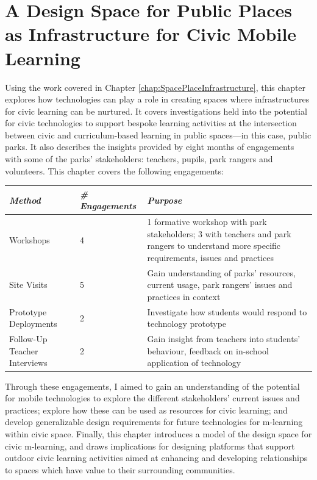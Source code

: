\chapter{A Design Space for Public Places as Infrastructure for Civic Mobile Learning}
\label{chap:DesignSpace}

Using the work covered in Chapter \ref{chap:SpacePlaceInfrastructure}, this chapter explores how technologies can play a role in creating spaces where infrastructures for civic learning can be nurtured. It covers investigations held into the potential for civic technologies to support bespoke learning activities at the intersection between civic and curriculum-based learning in public spaces---in this case, public parks. It also describes the insights provided by eight months of engagements with some of the parks' stakeholders: teachers, pupils, park rangers and volunteers. This chapter covers the following engagements:

{\centering
\begin{tabularx}{\textwidth}{| p{30mm} |  p{25mm} | X |}
\hline
    {\small\textit{\textbf{Method}}}
    & {\small\textit{\textbf{\# Engagements}}} 
    & {\small\textit{\textbf{Purpose}}} \\
    \hline
    {\footnotesize Workshops }
    & {\footnotesize 4} 
    & {\footnotesize 1 formative workshop with park stakeholders; 3 with teachers and park rangers to understand more specific requirements, issues and practices} \\
    \hline
    {\footnotesize Site Visits }
    & {\footnotesize 5} 
    & {\footnotesize Gain understanding of parks' resources, current usage, park rangers' issues and practices in context}  \\
    \hline
    \footnotesize Prototype Deployments
    & \footnotesize 2 
    & \footnotesize Investigate how students would respond to technology prototype \\
    \hline
    \footnotesize Follow-Up Teacher Interviews
    & \footnotesize 2 
    & \footnotesize Gain insight from teachers into students' behaviour, feedback on in-school application of technology \\
    \hline
\end{tabularx}
}

\setlength{\parskip}{1em}

Through these engagements, I aimed to gain an understanding of the potential for mobile technologies to explore the different stakeholders' current issues and practices; explore how these can be used as resources for civic learning; and develop generalizable design requirements for future technologies for m-learning within civic space. Finally, this chapter introduces a model of the design space for civic m-learning, and draws implications for designing platforms that support outdoor civic learning activities aimed at enhancing and developing relationships to spaces which have value to their surrounding communities. 

